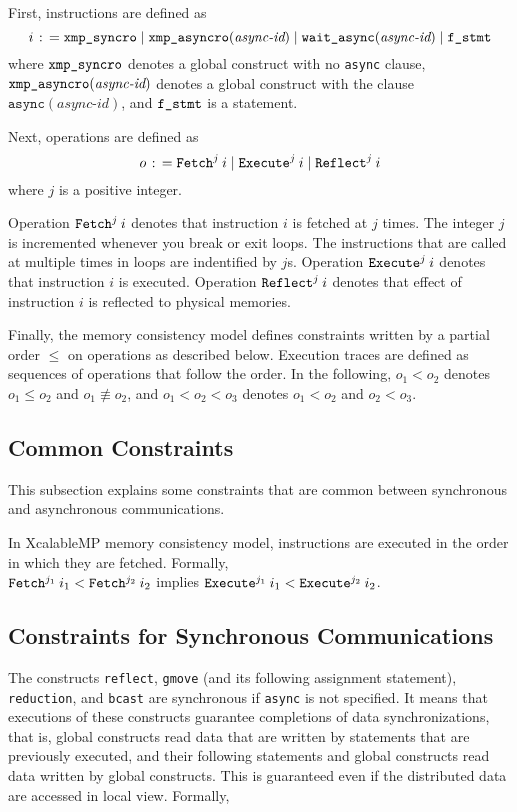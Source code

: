 First, instructions are defined as
\[
i \mathrel{\colon\!=} \texttt{xmp\_syncro} \mid \texttt{xmp\_asyncro}(\textit{async-id}) \mid \texttt{wait\_async}(\textit{async-id}) \mid \texttt{f\_stmt}
\]
where $\texttt{xmp\_syncro}$ denotes a global construct with no \texttt{async}
clause, $\texttt{xmp\_asyncro}(\textit{async-id})$ denotes a global construct with
the clause $\texttt{async}(\textit{async-id})$,
and $\texttt{f\_stmt}$ is a statement.

Next, operations are defined as
\[
o \mathrel{\colon\!=} \texttt{Fetch}^{j} \: {i} \mid \texttt{Execute}^{j} \: {i} \mid \texttt{Reflect}^{j} \: {i}
\]
where $j$ is a positive integer.

Operation $\texttt{Fetch}^{j} \: {i}$ denotes that instruction $i$ is fetched at $j$
times.  The integer $j$ is incremented whenever you break or exit
loops.  The instructions that are called at multiple times in loops
are indentified by $j$s.  Operation $\texttt{Execute}^{j} \: {i}$ denotes that
instruction $i$ is executed.  Operation $\texttt{Reflect}^{j} \: {i}$ denotes that effect
of instruction $i$ is reflected to physical memories.

Finally, the memory consistency model defines constraints written by a
partial order $\leq$ on operations as described below.  Execution
traces are defined as sequences of operations that follow the order.
In the following, $o_1 < o_2$ denotes $o_1 \leq o_2$ and $o_1
\not\equiv o_2$, and $o_1 < o_2 < o_3$ denotes $o_1 < o_2$ and $o_2 <
o_3$.

\subsection{Common Constraints}

This subsection explains some constraints that are common between
synchronous and asynchronous communications.

In XcalableMP memory consistency model, instructions are executed in
the order in which they are fetched.  Formally,\\

\noindent
$\texttt{Fetch}^{j_1} \: {i_1} < \texttt{Fetch}^{j_2} \: {i_2}$ implies $\texttt{Execute}^{j_1} \: {i_1} < \texttt{Execute}^{j_2} \: {i_2}$.

\subsection{Constraints for Synchronous Communications}

The constructs \texttt{reflect}, \texttt{gmove} (and its following
assignment statement), \texttt{reduction}, and \texttt{bcast} are
synchronous if \texttt{async} is not specified.  It means that
executions of these constructs guarantee completions of data
synchronizations, that is, global constructs read data that are
written by statements that are previously executed, and their
following statements and global constructs read data written by global
constructs.  This is guaranteed even if the distributed data are
accessed in local view.  Formally,\\

